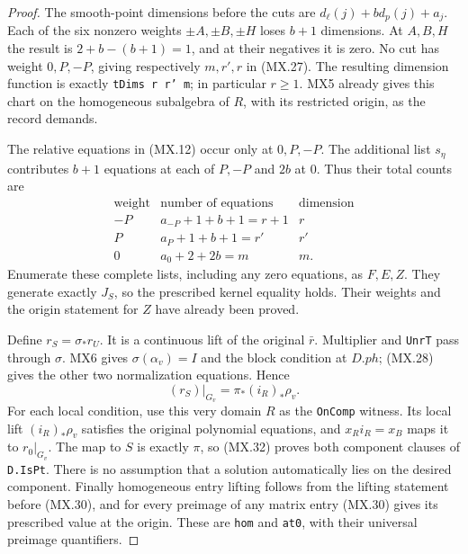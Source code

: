 \begin{proof}
The smooth-point dimensions before the cuts are
$d_\ell(j)+bd_p(j)+a_j$.
Each of the six nonzero weights $\pm A,\pm B,\pm H$
loses $b+1$ dimensions.  At $A,B,H$ the result is
$2+b-(b+1)=1$, and at their negatives it is zero.
No cut has weight $0,P,-P$, giving respectively
$m,r',r$ in (MX.27).  The resulting dimension function
is exactly \texttt{tDims r r' m}; in particular $r\ge1$.
MX5 already gives this chart on the homogeneous subalgebra
of $R$, with its restricted origin, as the record demands.

The relative equations in (MX.12) occur only at
$0,P,-P$.  The additional list $s_\eta$ contributes
$b+1$ equations at each of $P,-P$ and $2b$ at $0$.
Thus their total counts are
\[
 \begin{array}{c|c|c}
 \text{weight}&\text{number of equations}&\text{dimension}\\ \hline
 -P&a_{-P}+1+b+1=r+1&r\\
 P&a_P+1+b+1=r'&r'\\
 0&a_0+2+2b=m&m.
 \end{array}
 \tag{MX.31}
\]
Enumerate these complete lists, including any zero
equations, as $F,E,Z$.  They generate exactly $J_S$,
so the prescribed kernel equality holds.  Their weights
and the origin statement for $Z$ have already been proved.

Define $r_S=\sigma_*r_U$.  It is a continuous lift of
the original $\bar r$.  Multiplier and \texttt{UnrT}
pass through $\sigma$.  MX6 gives $\sigma(\alpha_v)=I$
and the block condition at $D.ph$; (MX.28) gives the
other two normalization equations.  Hence
\[
      (r_S)|_{G_v}=\pi_* (i_R)_*\rho_v.
 \tag{MX.32}
\]
For each local condition, use this very domain $R$ as
the \texttt{OnComp} witness.  Its local lift
$(i_R)_*\rho_v$ satisfies the original polynomial
equations, and $x_Ri_R=x_B$ maps it to $r_0|_{G_v}$.
The map to $S$ is exactly $\pi$, so (MX.32) proves
both component clauses of \texttt{D.IsPt}.  There is
no assumption that a solution automatically lies on the
desired component.
Finally homogeneous entry lifting follows from the
lifting statement before (MX.30), and for every preimage
of any matrix entry (MX.30) gives its prescribed value
at the origin.  These are \texttt{hom} and \texttt{at0},
with their universal preimage quantifiers.
\end{proof}

